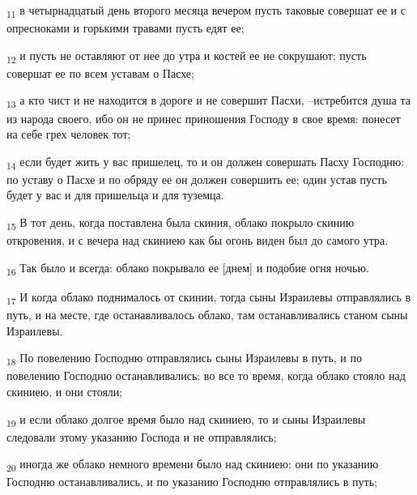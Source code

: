 \begin{tcolorbox}
\textsubscript{11} в четырнадцатый день второго месяца вечером пусть таковые совершат ее и с опресноками и горькими травами пусть едят ее;
\end{tcolorbox}
\begin{tcolorbox}
\textsubscript{12} и пусть не оставляют от нее до утра и костей ее не сокрушают; пусть совершат ее по всем уставам о Пасхе;
\end{tcolorbox}
\begin{tcolorbox}
\textsubscript{13} а кто чист и не находится в дороге и не совершит Пасхи, --истребится душа та из народа своего, ибо он не принес приношения Господу в свое время: понесет на себе грех человек тот;
\end{tcolorbox}
\begin{tcolorbox}
\textsubscript{14} если будет жить у вас пришелец, то и он должен совершать Пасху Господню: по уставу о Пасхе и по обряду ее он должен совершить ее; один устав пусть будет у вас и для пришельца и для туземца.
\end{tcolorbox}
\begin{tcolorbox}
\textsubscript{15} В тот день, когда поставлена была скиния, облако покрыло скинию откровения, и с вечера над скиниею как бы огонь виден был до самого утра.
\end{tcolorbox}
\begin{tcolorbox}
\textsubscript{16} Так было и всегда: облако покрывало ее [днем] и подобие огня ночью.
\end{tcolorbox}
\begin{tcolorbox}
\textsubscript{17} И когда облако поднималось от скинии, тогда сыны Израилевы отправлялись в путь, и на месте, где останавливалось облако, там останавливались станом сыны Израилевы.
\end{tcolorbox}
\begin{tcolorbox}
\textsubscript{18} По повелению Господню отправлялись сыны Израилевы в путь, и по повелению Господню останавливались: во все то время, когда облако стояло над скиниею, и они стояли;
\end{tcolorbox}
\begin{tcolorbox}
\textsubscript{19} и если облако долгое время было над скиниею, то и сыны Израилевы следовали этому указанию Господа и не отправлялись;
\end{tcolorbox}
\begin{tcolorbox}
\textsubscript{20} иногда же облако немного времени было над скиниею: они по указанию Господню останавливались, и по указанию Господню отправлялись в путь;
\end{tcolorbox}
